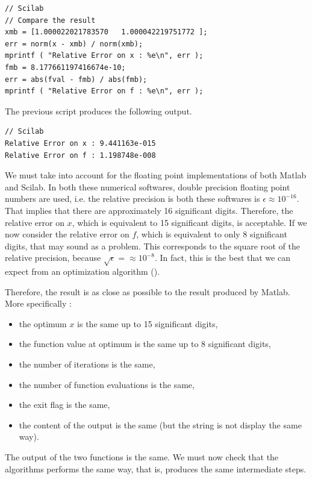 \lstset{language=scilabscript}
\begin{lstlisting}
// Scilab
// Compare the result
xmb = [1.000022021783570   1.000042219751772 ];
err = norm(x - xmb) / norm(xmb);
mprintf ( "Relative Error on x : %e\n", err );
fmb = 8.177661197416674e-10;
err = abs(fval - fmb) / abs(fmb);
mprintf ( "Relative Error on f : %e\n", err );
\end{lstlisting}

The previous script produces the following output.

\lstset{language=scilabscript}
\begin{lstlisting}
// Scilab
Relative Error on x : 9.441163e-015
Relative Error on f : 1.198748e-008
\end{lstlisting}

We must take into account for the floating point implementations 
of both Matlab and Scilab. In both these numerical softwares,
double precision floating point numbers are used, i.e. the relative 
precision is both these softwares is $\epsilon \approx 10^{-16}$. 
That implies that there are approximately 16 significant digits.
Therefore, the relative error on $x$, which is equivalent to 15
significant digits, is acceptable. 
If we now consider the relative error on $f$, which is equivalent 
to only 8 significant digits, that may sound as a problem.
This corresponds to the square root of the relative precision,
because $\sqrt{\epsilon} = \approx 10^{-8}$.
In fact, this is the best that we can expect from an optimization
algorithm (\cite{Brent73algorithmsfor,Gill81MurrayWright}). 

Therefore, the result is as close as possible to the result produced 
by Matlab. More specifically :
\begin{itemize}
\item the optimum $x$ is the same up to 15 significant digits,
\item the function value at optimum is the same up to 8 significant digits,
\item the number of iterations is the same,
\item the number of function evaluations is the same,
\item the exit flag is the same,
\item the content of the output is the same (but the string is not 
display the same way).
\end{itemize}

The output of the two functions is the same. 
We must now check that the algorithms performs the same way,
that is, produces the same intermediate steps.

